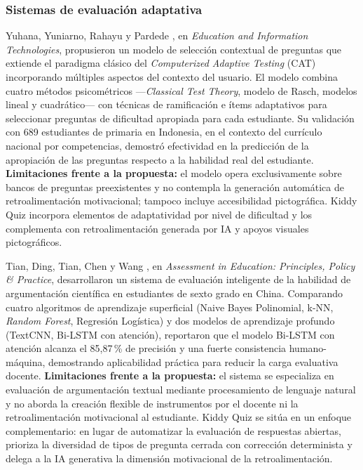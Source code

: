 \subsubsection{Sistemas de evaluación adaptativa}

Yuhana, Yuniarno, Rahayu y Pardede \cite{yuhana2024adaptive}, en \textit{Education and Information Technologies}, propusieron un modelo de selección contextual de preguntas que extiende el paradigma clásico del \textit{Computerized Adaptive Testing} (CAT) incorporando múltiples aspectos del contexto del usuario. El modelo combina cuatro métodos psicométricos ---\textit{Classical Test Theory}, modelo de Rasch, modelos lineal y cuadrático--- con técnicas de ramificación e ítems adaptativos para seleccionar preguntas de dificultad apropiada para cada estudiante. Su validación con 689 estudiantes de primaria en Indonesia, en el contexto del currículo nacional por competencias, demostró efectividad en la predicción de la apropiación de las preguntas respecto a la habilidad real del estudiante. \textbf{Limitaciones frente a la propuesta:} el modelo opera exclusivamente sobre bancos de preguntas preexistentes y no contempla la generación automática de retroalimentación motivacional; tampoco incluye accesibilidad pictográfica. Kiddy Quiz incorpora elementos de adaptatividad por nivel de dificultad y los complementa con retroalimentación generada por IA y apoyos visuales pictográficos.

Tian, Ding, Tian, Chen y Wang \cite{tian2025intelligent}, en \textit{Assessment in Education: Principles, Policy \& Practice}, desarrollaron un sistema de evaluación inteligente de la habilidad de argumentación científica en estudiantes de sexto grado en China. Comparando cuatro algoritmos de aprendizaje superficial (Naive Bayes Polinomial, k-NN, \textit{Random Forest}, Regresión Logística) y dos modelos de aprendizaje profundo (TextCNN, Bi-LSTM con atención), reportaron que el modelo Bi-LSTM con atención alcanza el 85,87\,\% de precisión y una fuerte consistencia humano-máquina, demostrando aplicabilidad práctica para reducir la carga evaluativa docente. \textbf{Limitaciones frente a la propuesta:} el sistema se especializa en evaluación de argumentación textual mediante procesamiento de lenguaje natural y no aborda la creación flexible de instrumentos por el docente ni la retroalimentación motivacional al estudiante. Kiddy Quiz se sitúa en un enfoque complementario: en lugar de automatizar la evaluación de respuestas abiertas, prioriza la diversidad de tipos de pregunta cerrada con corrección determinista y delega a la IA generativa la dimensión motivacional de la retroalimentación.

